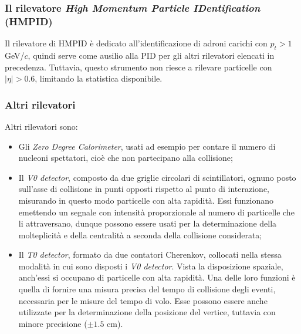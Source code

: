 \subsubsection{Il rilevatore \textit{High Momentum Particle IDentification} (HMPID)}
Il rilevatore di HMPID è dedicato all'identificazione di adroni carichi con $p_t > 1$ GeV/$c$, quindi serve come ausilio alla PID per gli altri rilevatori elencati in precedenza.
Tuttavia, questo strumento non riesce a rilevare particelle con $|\eta| >0.6$, limitando la statistica disponibile.

\subsubsection{Altri rilevatori}
Altri rilevatori sono:
\begin{itemize}
    \item Gli \emph{Zero Degree Calorimeter}, usati ad esempio per contare il numero di nucleoni spettatori, cioè che non partecipano alla collisione;
    \item Il \emph{V0 detector}, composto da due griglie circolari di scintillatori, ognuno posto sull'asse di collisione in punti opposti rispetto al punto di interazione, misurando in questo modo particelle con alta rapidità.
    Essi funzionano emettendo un segnale con intensità proporzionale al numero di particelle che li attraversano, dunque possono essere usati per la determinazione della molteplicità e della centralità a seconda della collisione considerata;
    \item Il \emph{T0 detector}, formato da due contatori Cherenkov, collocati nella stessa modalità in cui sono disposti i \textit{V0 detector}.
    Vista la disposizione spaziale, anch'essi si occupano di particelle con alta rapidità.
    Una delle loro funzioni è quella di fornire una misura precisa del tempo di collisione degli eventi, necessaria per le misure del tempo di volo.
    Esse possono essere anche utilizzate per la determinazione della posizione del vertice, tuttavia con minore precisione ($\pm 1.5$ cm).
\end{itemize}

